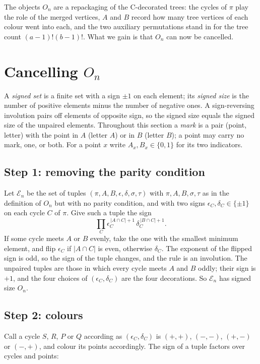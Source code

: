 \documentclass[11pt]{amsart}
\theoremstyle{remark}
\begin{document}
The objects $O_n$ are a repackaging of the C-decorated trees: the cycles of $\pi$ play the role of the merged
vertices, $A$ and $B$ record how many tree vertices of each colour went into each, and the two auxiliary
permutations stand in for the tree count $(a-1)!(b-1)!$. What we gain is that $O_n$ can now be cancelled.

\section{Cancelling $O_n$}\label{sec:cancel}

A \emph{signed set} is a finite set with a sign $\pm1$ on each element; its \emph{signed size} is the number of
positive elements minus the number of negative ones. A sign-reversing involution pairs off elements of opposite sign,
so the signed size equals the signed size of the unpaired elements. Throughout this section a \emph{mark} is a pair
(point, letter) with the point in $A$ (letter $A$) or in $B$ (letter $B$); a point may carry no mark, one, or both.
For a point $x$ write $A_x,B_x\in\{0,1\}$ for its two indicators.

\subsection*{Step 1: removing the parity condition}
Let $\mathcal E_n$ be the set of tuples $(\pi,A,B,\epsilon,\delta,\sigma,\tau)$ with $\pi,A,B,\sigma,\tau$ as in the
definition of $O_n$ but with no parity condition, and with two signs $\epsilon_C,\delta_C\in\{\pm1\}$ on each cycle $C$
of $\pi$. Give such a tuple the sign
\[
  \prod_{C}\epsilon_C^{\,|A\cap C|+1}\,\delta_C^{\,|B\cap C|+1}.
\]
If some cycle meets $A$ or $B$ evenly, take the one with the smallest minimum element, and flip $\epsilon_C$ if
$|A\cap C|$ is even, otherwise $\delta_C$. The exponent of the flipped sign is odd, so the sign of the tuple changes,
and the rule is an involution. The unpaired tuples are those in which every cycle meets $A$ and $B$ oddly; their sign
is $+1$, and the four choices of $(\epsilon_C,\delta_C)$ are the four decorations. So $\mathcal E_n$ has signed size
$O_n$.

\subsection*{Step 2: colours}
Call a cycle $S$, $R$, $P$ or $Q$ according as $(\epsilon_C,\delta_C)$ is $(+,+)$, $(-,-)$, $(+,-)$ or $(-,+)$, and
colour its points accordingly. The sign of a tuple factors over cycles and points:
\end{document}

